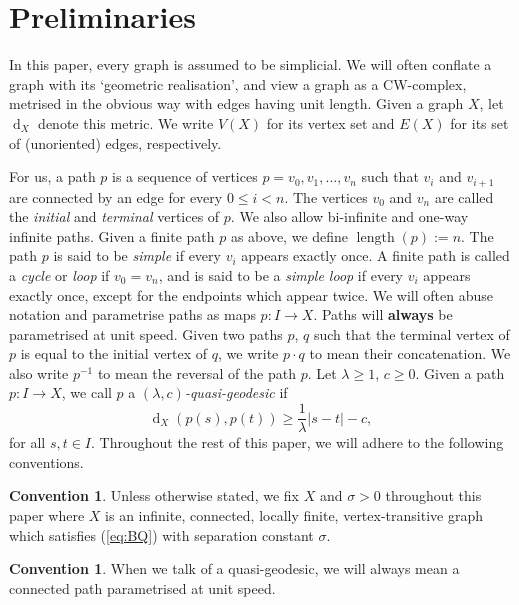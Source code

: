 \documentclass[11pt,a4paper]{amsart}
\DeclareMathOperator{\length}{length}
\DeclareMathOperator{\dist}{d}
\theoremstyle{definition}
\newtheorem{convention}[theorem]{Convention}
\newcommand{\property}{(\ref{eq:BQ})}
\begin{document}
\section{Preliminaries}\label{sec:prelims}


In this paper, every graph is assumed to be simplicial. We will often conflate a graph with its `geometric realisation', and view a graph as a CW-complex, metrised in the obvious way with edges having unit length. Given a graph $X$, let $\dist_X$ denote this metric. We write $V(X)$ for its vertex set and $E(X)$ for its set of (unoriented) edges, respectively. 

For us, a path $p$ is a sequence of vertices $p = v_0, v_1, \ldots, v_n$ such that $v_i$ and $v_{i+1}$ are connected by an edge for every $0 \leq i < n$. The vertices $v_0$ and $v_n$ are called the \emph{initial} and \emph{terminal} vertices of $p$. We also allow bi-infinite and one-way infinite paths. Given a finite path $p$ as above, we define $\length(p) := n$. The path $p$ is said to be \emph{simple} if every $v_i$ appears exactly once. A finite path is called a \emph{cycle} or \emph{loop} if $v_0 = v_n$, and is said to be a \emph{simple loop} if every $v_i$ appears exactly once, except for the endpoints which appear twice. 
We will often abuse notation and parametrise paths as maps $p : I \to X$. Paths will \textbf{always} be parametrised at unit speed. Given two paths $p$, $q$ such that the terminal vertex of $p$ is equal to the initial vertex of $q$, we write $p \cdot q$ to mean their concatenation. We also write $p^{-1}$ to mean the reversal of the path $p$. 
Let $\lambda \geq 1$, $c \geq 0$. Given a path $p : I \to X$, we call $p$ a \emph{$(\lambda, c)$-quasi-geodesic} if
$$
\dist_X(p(s),p(t)) \geq \frac 1 \lambda |s-t| - c,
$$
for all $s,t \in I$. 
Throughout the rest of this paper, we will adhere to the following conventions.

\begin{convention}
    Unless otherwise stated, we fix $X$ and $\sigma > 0$ throughout this paper where $X$ is an  infinite, connected, locally finite, vertex-transitive graph which satisfies \property{} with separation constant $\sigma$. 
\end{convention}

\begin{convention}
    When we talk of a quasi-geodesic, we will always mean a connected path parametrised at unit speed. 
\end{convention}
\end{document}
